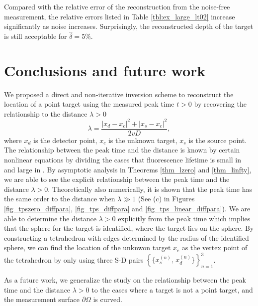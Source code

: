 \documentclass[10pt]{article}
\numberwithin{equation}{section}
\numberwithin{figure}{section}
\begin{document}
Compared with the relative error of the reconstruction from the noise-free measurement, the relative errors listed in Table \ref{tbl:ex_large_lt02} increase significantly as noise increases. Surprisingly, the reconstructed depth of the target is still acceptable for $\hat\delta=5\%$.

\section{Conclusions and future work}\label{sec_conc}
We proposed a direct and non-iterative inversion scheme to reconstruct the location of a point target using the measured peak time $t>0$ by recovering the relationship to the distance $\lambda>0$
\begin{equation}\label{Distan}
\lambda = \frac{|x_d-x_c|^2+|x_s-x_c|^2}{2vD},
\end{equation}
where $x_d$ is the detector point, $x_c$ is the unknown target, $x_s$ is the source point. The relationship between the peak time and the distance is known by certain nonlinear equations by dividing the cases that fluorescence lifetime is small in \cite{Chen2023} and large in \cite{Chen2025}. By asymptotic analysis in Theorems \ref{thm_lzero} and \ref{thm_linfty}, we are able to see the explicit relationship between the peak time and the distance $\lambda>0$. Theoretically also numerically, it is shown that the peak time has the same order to the distance when $\lambda \gg 1$ (See (c) in Figures \ref{fig_tpszero_diffpara}, \ref{fig_tps_diffpara} and \ref{fig_tps_linear_diffpara}). We are able to determine the distance $\lambda>0$ explicitly from the peak time which implies that the sphere for the target is identified, where the target lies on the sphere. By constructing a tetrahedron with edges determined by the radius of the identified sphere, we can find the location of the unknwon target $x_c$ as the vertex point of the tetrahedron by only using three S-D pairs  $\left\{\{x_s^{(n)},\,x_d^{(n)}\}\right\}_{n=1}^3$.

As a future work, we generalize the study on the relationship between the peak time and the distance $\lambda>0$ to the cases
where a target is not a point target, and the measurement surface $\partial\Omega$ is curved. 
\begin{comment}
The first task to start this study will be to have the Green function for the FDOT under the setup, including these cases. This is available by easily modifying the argument in one of our coauthors' papers \cite{Nakamura} giving the Green function for the interior transmission problem. The advantage of the mentioned argument is based on using the parabolic scaling which immediately gives the dominant part of the Green function. In relation to this, we note that the distance function is invariant under the parabolic scaling. Assuming the targets are well-separated convex domains and looking at the dominant part of the Green function, we speculate that we will find a similar situation as for the point target case in a neighborhood of the point that the mentioned sphere touches the target.
\end{comment}
\end{document}
